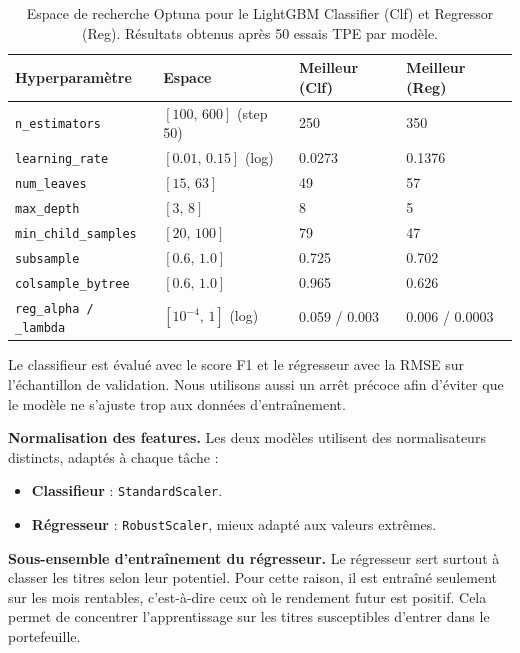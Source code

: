 \documentclass[11pt,a4paper]{article}
\begin{document}
\begin{table}[H]
\centering
\small
\begin{tabular}{llll}
\toprule
\textbf{Hyperparamètre} & \textbf{Espace} & \textbf{Meilleur (Clf)} & \textbf{Meilleur (Reg)} \\
\midrule
\texttt{n\_estimators}      & $[100,\,600]$ (step 50) & 250 & 350 \\
\texttt{learning\_rate}     & $[0.01,\,0.15]$ (log)  & 0.0273 & 0.1376 \\
\texttt{num\_leaves}        & $[15,\,63]$             & 49 & 57 \\
\texttt{max\_depth}         & $[3,\,8]$               & 8 & 5 \\
\texttt{min\_child\_samples}& $[20,\,100]$            & 79 & 47 \\
\texttt{subsample}          & $[0.6,\,1.0]$           & 0.725 & 0.702 \\
\texttt{colsample\_bytree}  & $[0.6,\,1.0]$           & 0.965 & 0.626 \\
\texttt{reg\_alpha / \_lambda} & $[10^{-4},\,1]$ (log) & 0.059 / 0.003 & 0.006 / 0.0003 \\
\bottomrule
\end{tabular}
\caption{Espace de recherche Optuna pour le LightGBM Classifier (Clf) et Regressor (Reg). Résultats obtenus après 50 essais TPE par modèle.}
\label{tab:optuna_space}
\end{table}

Le classifieur est évalué avec le score F1 et le régresseur avec la RMSE sur l'échantillon de validation. Nous utilisons aussi un arrêt précoce afin d'éviter que le modèle ne s'ajuste trop aux données d'entraînement.

\textbf{Normalisation des features.} Les deux modèles utilisent des normalisateurs distincts, adaptés à chaque tâche :
\begin{itemize}
    \item \textbf{Classifieur} : \texttt{StandardScaler}.
    \item \textbf{Régresseur} : \texttt{RobustScaler}, mieux adapté aux valeurs extrêmes.
\end{itemize}

\textbf{Sous-ensemble d'entraînement du régresseur.} Le régresseur sert surtout à classer les titres selon leur potentiel. Pour cette raison, il est entraîné seulement sur les mois rentables, c'est-à-dire ceux où le rendement futur est positif. Cela permet de concentrer l'apprentissage sur les titres susceptibles d'entrer dans le portefeuille.
\end{document}
